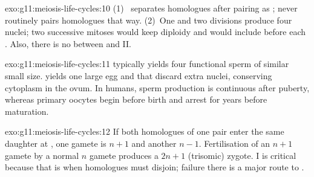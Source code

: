\begin{solution}{exo:g11:meiosis-life-cycles:10}
(1)~ separates homologues after pairing as ;  never
routinely pairs homologues that way. (2)~One  and two divisions
produce four  nuclei; two successive mitoses would keep diploidy and
would include  before each . Also, there is no 
between  and II.
\end{solution}

\begin{solution}{exo:g11:meiosis-life-cycles:11}
 typically yields four functional sperm of similar small size.
 yields one large egg and  that discard extra nuclei,
conserving cytoplasm in the ovum. In humans, sperm production is continuous
after puberty, whereas primary oocytes begin  before birth and arrest
for years before maturation.
\end{solution}

\begin{solution}{exo:g11:meiosis-life-cycles:12}
If both homologues of one pair enter the same daughter at , one
gamete is $n+1$ and another $n-1$. Fertilisation of an $n+1$ gamete by a
normal $n$ gamete produces a $2n+1$ (trisomic) zygote.  I is critical
because that is when homologues must disjoin; failure there is a major route
to .
\end{solution}

